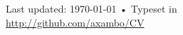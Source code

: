 \documentclass[10pt, a4paper]{article}
\begin{document}
\vfill{}

\begin{center}
{\scriptsize  Last updated: \today\- •\- 
Typeset in \href{http://nitens.org/taraborelli/cvtex}{
\XeTeX }\\
\href{http://github.com/axambo/CV}{http://github.com/axambo/CV}}
\end{center}
\end{document}
